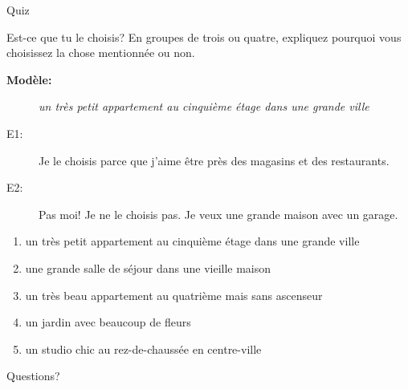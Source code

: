 \documentclass{beamer}
\begin{document}
  \begin{frame}{}
    \begin{center}
      \Large Quiz
    \end{center}
  \end{frame}

  \begin{frame}{Est-ce que tu le choisis?}
    \small
    En groupes de trois ou quatre, expliquez pourquoi vous choisissez la chose mentionnée ou non.
    \begin{description}
      \item[\textbf{Modèle:}] \emph{un très petit appartement au cinquième étage dans une grande ville}
      \item[E1:] Je le choisis parce que j'aime être près des magasins et des restaurants.
      \item[E2:] Pas moi! Je ne le choisis pas. Je veux une grande maison avec un garage.
    \end{description}
    \begin{enumerate}
      \item un très petit appartement au cinquième étage dans une grande ville
      \item une grande salle de séjour dans une vieille maison
      \item un très beau appartement au quatrième mais sans ascenseur
      \item un jardin avec beaucoup de fleurs
      \item un studio chic au rez-de-chaussée en centre-ville
    \end{enumerate}
  \end{frame}

  \begin{frame}{}
    \begin{center}
      \Large Questions?
    \end{center}
  \end{frame}
\end{document}
